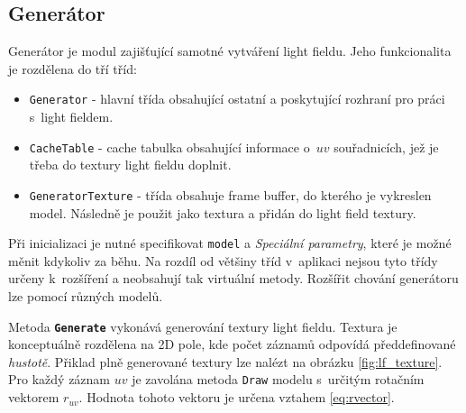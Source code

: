 
\subsection{Generátor}
Generátor je modul zajišťující samotné vytváření light fieldu. Jeho funkcionalita je rozdělena do tří tříd:
\begin{itemize}
    \item \texttt{Generator} - hlavní třída obsahující ostatní a poskytující rozhraní pro práci s~light fieldem. 
    \item \texttt{CacheTable} - cache tabulka obsahující informace o~${uv}$ souřadnicích, jež je třeba do textury light fieldu doplnit.
    \item \texttt{GeneratorTexture} - třída obsahuje frame buffer, do kterého je vykreslen model. Následně je použit jako textura a přidán do light field textury.
\end{itemize}
Při inicializaci je nutné specifikovat \texttt{model} a \emph{Speciální parametry}, které je možné měnit kdykoliv za běhu. Na rozdíl od většiny tříd v~aplikaci nejsou tyto třídy určeny k~rozšíření a neobsahují tak virtuální metody. Rozšířit chování generátoru lze pomocí různých modelů.

Metoda \texttt{\textbf{Generate}} vykonává generování textury light fieldu. Textura je konceptuálně rozdělena na 2D pole, kde počet záznamů odpovídá předdefinované \emph{hustotě}. Přiklad plně generované textury lze nalézt na obrázku \ref{fig:lf_texture}. Pro každý záznam $uv$ je zavolána metoda \texttt{Draw} modelu s~určitým rotačním vektorem $r_{uv}$. Hodnota tohoto vektoru je určena vztahem \ref{eq:rvector}.


